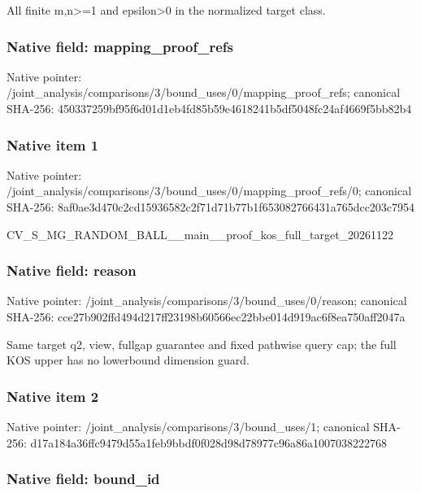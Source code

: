 \documentclass[10pt,a4paper]{article}
\begin{document}
All finite m,n>=1 and epsilon>0 in the normalized target class.


\subsubsection{Native field: mapping\_proof\_refs}


Native pointer: /joint\_analysis/comparis\allowbreak{}ons/3/bound\_uses/0/mappi\allowbreak{}ng\_proof\_refs; canonical SHA-256: 450337259bf95f6d01d1eb4f\allowbreak{}d85b59e4618241b5df5048fc\allowbreak{}24af4669f5bb82b4



\subsubsection{Native item 1}


Native pointer: /joint\_analysis/comparis\allowbreak{}ons/3/bound\_uses/0/mappi\allowbreak{}ng\_proof\_refs/0; canonical SHA-256: 8af0ae3d470c2cd15936582c\allowbreak{}2f71d71b77b1f65308276643\allowbreak{}1a765dcc203c7954


CV\_S\_MG\_RANDOM\_BALL\_\_mai\allowbreak{}n\_\_proof\_kos\_full\_target\allowbreak{}\_20261122


\subsubsection{Native field: reason}


Native pointer: /joint\_analysis/comparis\allowbreak{}ons/3/bound\_uses/0/reaso\allowbreak{}n; canonical SHA-256: cce27b902ffd494d217ff231\allowbreak{}98b60566ec22bbe014d919ac\allowbreak{}6f8ea750aff2047a


Same target q2, view, fullgap guarantee and fixed pathwise query cap; the full KOS upper has no lowerbound dimension guard.


\subsubsection{Native item 2}


Native pointer: /joint\_analysis/comparis\allowbreak{}ons/3/bound\_uses/1; canonical SHA-256: d17a184a36ffc9479d55a1fe\allowbreak{}b9bbdf0f028d98d78977c96a\allowbreak{}86a1007038222768



\subsubsection{Native field: bound\_id}
\end{document}
